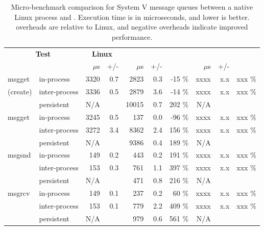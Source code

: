\begin{table}[t!b!]
\footnotesize
\centering
\begin{tabular}{|ll|rr|rrr|rrr|}
\hline
\multicolumn{2}{|c|}{{\bf Test}} &
\multicolumn{2}{c|}{{\bf Linux}} &
\multicolumn{3}{c|}{{\bf \sysname{}}} &
\multicolumn{3}{c|}{{\bf \graphenesgx{}}} \\
 & & $\mu$s & +/- & $\mu$s & +/- & & $\mu$s & +/- & \\
\hline
msgget   & in-process    & 3320	& 0.7 &  2823 & 0.3 &	-15	\%	&  xxxx & x.x &	xxx	\%	\\
(create) & inter-process & 3336	& 0.5 &  2879 & 3.6 &	-14	\%	&  xxxx & x.x &	xxx	\%	\\
         & persistent    &  N/A	&     & 10015 & 0.7 &	202	\%	&   N/A &     &         \\
\hline								
msgget   & in-process    & 3245	& 0.5 &   137 & 0.0 &	-96	\%	&  xxxx & x.x &	xxx	\%	\\
         & inter-process & 3272	& 3.4 &  8362 & 2.4 &	156	\%	&  xxxx & x.x & xxx	\%	\\
         & persistent    &  N/A	&     &  9386 & 0.4 &	189	\%	&   N/A &     &         \\
\hline								
msgsnd   & in-process    &  149	& 0.2 &   443 & 0.2 &	191	\%	&  xxxx & x.x &	xxx	\%	\\
         & inter-process &  153	& 0.3 &   761 & 1.1 &	397	\%	&  xxxx & x.x & xxx	\%	\\
         & persistent    &  N/A	&     &   471 & 0.8 &	216	\%	&   N/A &     &         \\
\hline								
msgrcv   & in-process    &  149	& 0.1 &   237 & 0.2 &	60	\%	&  xxxx & x.x & xxx	\%	\\
         & inter-process &  153	& 0.1 &   779 & 2.2 &	409	\%  &  xxxx & x.x & xxx	\%	\\
         & persistent    &  N/A	&     &   979 & 0.6 &	561	\%	&   N/A &     &         \\ \hline
\end{tabular}
\caption[The \microbench{} results for System V message queues in Linux, KVM, and \sysname{}]
{Micro-benchmark comparison for System V message queues
between a native Linux process and \sysname{} \picoprocs{}.
Execution time is in microseconds, and lower is better.
overheads are relative to Linux, and negative overheads indicate improved performance. }
\label{tab:graphene:msgq}
\end{table}

